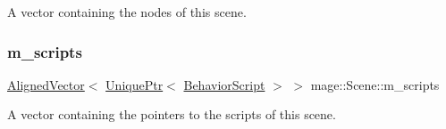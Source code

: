 A vector containing the nodes of this scene. \mbox{\label{classmage_1_1_scene_ae57ca3aeb6b0d8b2cb8cf40334b883f8}} 
\subsubsection{\texorpdfstring{m\+\_\+scripts}{m\_scripts}}
{\footnotesize\ttfamily \mbox{\hyperlink{namespacemage_a8664bfb5ce2179fc64eae9f82c8a5ba8}{Aligned\+Vector}}$<$ \mbox{\hyperlink{namespacemage_a3316d7143a973e37adf1110f2e80ca31}{Unique\+Ptr}}$<$ \mbox{\hyperlink{classmage_1_1_behavior_script}{Behavior\+Script}} $>$ $>$ mage\+::\+Scene\+::m\+\_\+scripts\hspace{0.3cm}{\ttfamily [private]}}

A vector containing the pointers to the scripts of this scene. 